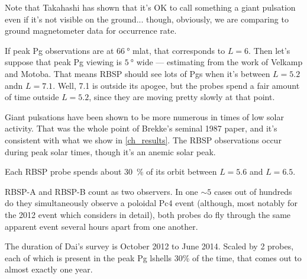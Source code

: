 Note that Takahashi\cite{takahashi_2013} has shown that it's OK to call something a giant pulsation even if it's not visible on the ground... though, obviously, we are comparing to ground magnetometer data for occurrence rate. 

If peak Pg observations are at $\SI{66}{\degree}$ mlat, that corresponds to $L = 6$. Then let's suppose that peak Pg viewing is $\SI{5}{\degree}$ wide --- estimating from the work of Velkamp and Motoba. That means RBSP should see lots of Pgs when it's between $L = 5.2$ andn $L = 7.1$. Well, \SI{7.1}{\RE} is outside its apogee, but the probes spend a fair amount of time outside $L = 5.2$, since they are moving pretty slowly at that point. 

Giant pulsations have been shown to be more numerous in times of low solar activity. That was the whole point of Brekke's seminal 1987 paper, and it's consistent with what we show in \cref{ch_results}. The RBSP observations occur during peak solar times, though it's an anemic solar peak\cite{pesnell_2016}. 


Each RBSP probe spends about \SI{30}{\percent} of its orbit between $L = 5.6$ and $L = 6.5$. 

RBSP-A and RBSP-B count as two observers. In one $\sim 5$ cases out of hundreds do they simultaneously observe a poloidal Pc4 event (although, most notably for the 2012 event which \cite{dai_2013} considers in detail), both probes do fly through the same apparent event several hours apart from one another. 

The duration of Dai's survey is October 2012 to June 2014. Scaled by 2 probes, each of which is present in the peak Pg lshells 30\% of the time, that comes out to almost exactly one year. 









